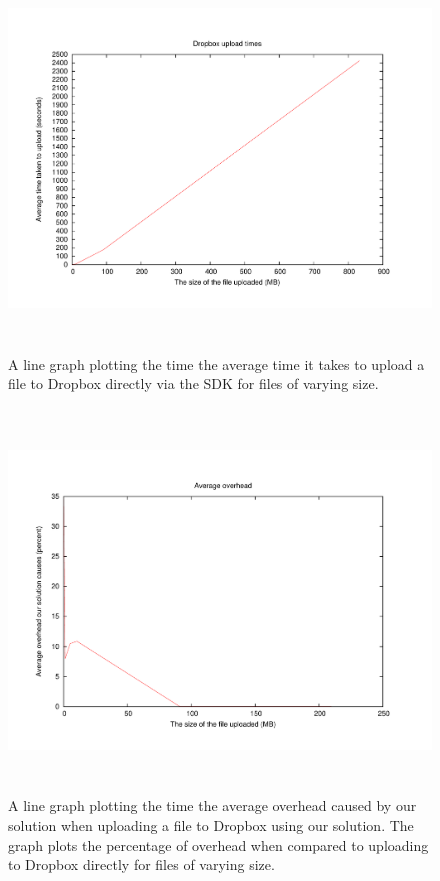 \documentclass[12pt, titlepage]{article}
\begin{document}
\begin{figure}[H]
\centerline{\includegraphics[height=4.0in,width=7in,angle=0]{plots/dropboxUpload/dropboxUploadTimes.pdf}}
\caption{A line graph plotting the time the average time it takes to upload a file to Dropbox directly via the SDK for files of varying size.}
\label{fig:dropboxUploadLineGraph}
\end{figure}

\begin{figure}[H]
\centerline{\includegraphics[height=4.0in,width=7in,angle=0]{plots/uploadOverhead/uploadOverhead.pdf}}
\caption{A line graph plotting the time the average overhead caused by our solution when uploading a file to Dropbox using our solution. The graph plots the percentage of overhead when compared to uploading to Dropbox directly for files of varying size.}
\label{fig:uploadOverheadLineGraph}
\end{figure}
\end{document}
